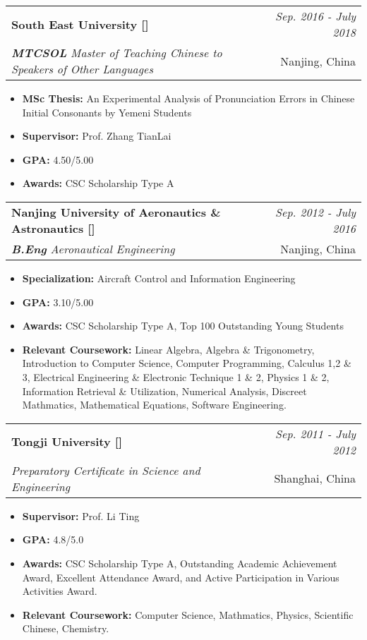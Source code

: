 \documentclass[a4paper,11pt]{article}
\makeatletter
\newcommand{\resumeSubheading}[4]{
	\vspace{0.5mm}\item
	\begin{tabular*}{0.98\textwidth}[t]{l@{\extracolsep{\fill}}r}
		\textbf{#1} & \textit{\footnotesize{#4}} \\
		\textit{\footnotesize{#3}} &  \footnotesize{#2}\\
	\end{tabular*}
	\vspace{-1.0mm}
}
\newcommand{\resumeItemListStart}{\begin{itemize}[leftmargin=*,labelsep=1mm,itemsep=0.5mm]}
\newcommand{\resumeItemListEnd}{\end{itemize}\vspace{-2mm}}
\makeatother
\begin{document}
	\resumeSubheading
	{South East University [\href{https://1drv.ms/b/c/0b66680558f854cf/EZ6IBz28Vu1HkfYbkDgmtUUBh_bQMBNlrJH0y5fedP4pCg?e=dXOP9c}{\faIcon{globe}}]}{Nanjing, China}
	{\textbf{MTCSOL} Master of Teaching Chinese to Speakers of Other Languages }{Sep. 2016 - July 2018}
	\resumeItemListStart
	\item \textbf{MSc Thesis:} An Experimental Analysis of Pronunciation Errors in Chinese Initial Consonants by Yemeni Students
	\item \textbf{Supervisor:} Prof. Zhang TianLai
	\item \textbf{GPA:} 4.50/5.00
	\item \textbf{Awards:} CSC Scholarship Type A
	\resumeItemListEnd

	\resumeSubheading
	{Nanjing University of Aeronautics \& Astronautics [\href{https://1drv.ms/b/c/0b66680558f854cf/EWNwcEpNXSxDgGY2XtRoH8ABN-HndmwzFW5RBjuSeB4H-A?e=4fZaLe}{\faIcon{globe}}]}{Nanjing, China}
	{\textbf{B.Eng} Aeronautical Engineering}{Sep. 2012 - July 2016}
	\resumeItemListStart
	\item \textbf{Specialization:} Aircraft Control and Information Engineering
	\item \textbf{GPA:} 3.10/5.00
	\item \textbf{Awards:} CSC Scholarship Type A, Top 100 Outstanding Young Students
	\item \textbf{Relevant Coursework:} Linear Algebra, Algebra \& Trigonometry, Introduction to Computer Science, Computer Programming, Calculus 1,2 \& 3, Electrical Engineering \& Electronic Technique 1 \& 2, Physics 1 \& 2, Information Retrieval \& Utilization, Numerical Analysis, Discreet Mathmatics, Mathematical Equations, Software Engineering.
	\resumeItemListEnd
	
	\resumeSubheading
	{Tongji University [\href{https://1drv.ms/b/c/0b66680558f854cf/EYA7wC5Ad_FPjbqRLHAKbsUBUG4ZOGk8byilERusmPVQaQ?e=0xjWBs}{\faIcon{globe}}]}{Shanghai, China}
	{Preparatory Certificate in Science and Engineering}{Sep. 2011 - July 2012}
	\resumeItemListStart
	\item \textbf{Supervisor:} Prof. Li Ting
	\item \textbf{GPA:} 4.8/5.0
	\item \textbf{Awards:} CSC Scholarship Type A, Outstanding Academic Achievement Award, Excellent Attendance Award, and Active Participation in Various Activities Award.
	\item \textbf{Relevant Coursework:} Computer Science, Mathmatics, Physics, Scientific Chinese, Chemistry.
	\resumeItemListEnd
	
\end{document}
